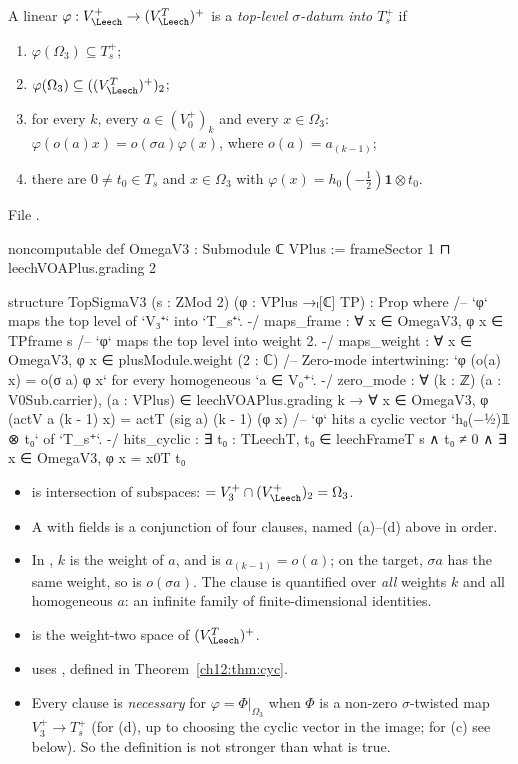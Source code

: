 \begin{definition}\label{ch12:def:TopSigmaV3}
A linear $\varphi:V_\Leech^+\to(V_\Leech^T)^+$ is a \emph{top-level $\sigma$-datum into $T_s^+$} if
\begin{enumerate}[label=(\alph*)]
\item $\varphi(\Omega_3)\subseteq T_s^+$;
\item $\varphi(\Omega_3)\subseteq((V_\Leech^T)^+)_2$;
\item for every $k$, every $a\in(V_0^+)_k$ and every $x\in\Omega_3$:
  $\varphi(o(a)x)=o(\sigma a)\varphi(x)$, where $o(a)=a_{(k-1)}$;
\item there are $0\neq t_0\in T_s$ and $x\in\Omega_3$ with $\varphi(x)=h_0(-\tfrac12)\mathbf 1\otimes t_0$.
\end{enumerate}
\end{definition}
File .
\begin{leancode}
noncomputable def OmegaV3 : Submodule ℂ VPlus := frameSector 1 ⊓ leechVOAPlus.grading 2

structure TopSigmaV3 (s : ZMod 2) (φ : VPlus →ₗ[ℂ] TP) : Prop where
  /-- `φ` maps the top level of `V₃⁺` into `T_s⁺`. -/
  maps_frame : ∀ x ∈ OmegaV3, φ x ∈ TPframe s
  /-- `φ` maps the top level into weight 2. -/
  maps_weight : ∀ x ∈ OmegaV3, φ x ∈ plusModule.weight (2 : ℂ)
  /-- Zero-mode intertwining: `φ (o(a) x) = o(σ a) φ x` for every homogeneous `a ∈ V₀⁺`. -/
  zero_mode : ∀ (k : ℤ) (a : V0Sub.carrier), (a : VPlus) ∈ leechVOAPlus.grading k →
    ∀ x ∈ OmegaV3, φ (actV a (k - 1) x) = actT (sig a) (k - 1) (φ x)
  /-- `φ` hits a cyclic vector `h₀(−½)𝟙 ⊗ t₀` of `T_s⁺`. -/
  hits_cyclic : ∃ t₀ : TLeechT, t₀ ∈ leechFrameT s ∧ t₀ ≠ 0 ∧ ∃ x ∈ OmegaV3, φ x = x0T t₀
\end{leancode}
\begin{dictionary}
\begin{itemize}
\item {} is intersection of subspaces:  $=V_3^+\cap(V_\Leech^+)_2=\Omega_3$.
\item A  with  fields is a conjunction of four clauses, named
  (a)--(d) above in order.
\item In , $k$ is the weight of $a$, and  is $a_{(k-1)}=o(a)$; on
  the target, $\sigma a$ has the same weight, so  is $o(\sigma a)$.  The
  clause is quantified over \emph{all} weights $k$ and all homogeneous $a$: an infinite family of
  finite-dimensional identities.
\item {} is the weight-two space of $(V_\Leech^T)^+$.
\item {} uses , defined in Theorem~\ref{ch12:thm:cyc}.
\item Every clause is \emph{necessary} for $\varphi=\Phi|_{\Omega_3}$ when $\Phi$ is a non-zero
  $\sigma$-twisted map $V_3^+\to T_s^+$ (for (d), up to choosing the cyclic vector in the image;
  for (c) see  below).  So the definition is not stronger than what is
  true.
\end{itemize}
\end{dictionary}

